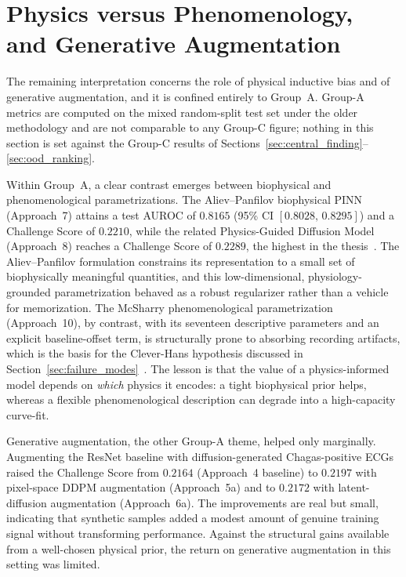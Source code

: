 \section{Physics versus Phenomenology, and Generative Augmentation}
\label{sec:physics_phenomenology}

The remaining interpretation concerns the role of physical inductive bias and of generative augmentation, and it is confined entirely to Group~A. Group-A metrics are computed on the mixed random-split test set under the older methodology and are not comparable to any Group-C figure; nothing in this section is set against the Group-C results of Sections~\ref{sec:central_finding}--\ref{sec:ood_ranking}.

Within Group~A, a clear contrast emerges between biophysical and phenomenological parametrizations. The Aliev--Panfilov biophysical PINN (Approach~7) attains a test AUROC of $0.8165$ (95\% CI $[0.8028,\,0.8295]$) and a Challenge Score of $0.2210$, while the related Physics-Guided Diffusion Model (Approach~8) reaches a Challenge Score of $0.2289$, the highest in the thesis~\cite{aliev1996simple}. The Aliev--Panfilov formulation constrains its representation to a small set of biophysically meaningful quantities, and this low-dimensional, physiology-grounded parametrization behaved as a robust regularizer rather than a vehicle for memorization. The McSharry phenomenological parametrization (Approach~10), by contrast, with its seventeen descriptive parameters and an explicit baseline-offset term, is structurally prone to absorbing recording artifacts, which is the basis for the Clever-Hans hypothesis discussed in Section~\ref{sec:failure_modes}~\cite{mcsharry2003dynamical}. The lesson is that the value of a physics-informed model depends on \emph{which} physics it encodes: a tight biophysical prior helps, whereas a flexible phenomenological description can degrade into a high-capacity curve-fit.

Generative augmentation, the other Group-A theme, helped only marginally. Augmenting the ResNet baseline with diffusion-generated Chagas-positive ECGs raised the Challenge Score from $0.2164$ (Approach~4 baseline) to $0.2197$ with pixel-space DDPM augmentation (Approach~5a) and to $0.2172$ with latent-diffusion augmentation (Approach~6a). The improvements are real but small, indicating that synthetic samples added a modest amount of genuine training signal without transforming performance. Against the structural gains available from a well-chosen physical prior, the return on generative augmentation in this setting was limited.

